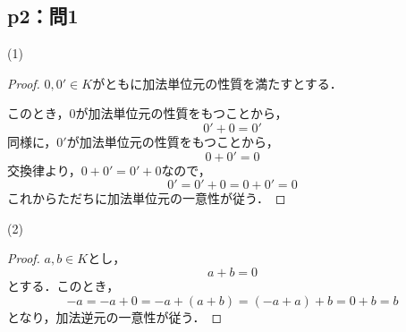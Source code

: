 \documentclass[uplatex,dvipdfmx,a4paper,10pt,fleqn]{jsarticle}
\begin{document}
\subsection*{p2：問1}

\begin{itembox}[c]{(1)}
    \begin{proof}
$0,0' \in K$がともに加法単位元の性質を満たすとする．

このとき，$0$が加法単位元の性質をもつことから，
\[
    0'+0=0'
\]
同様に，$0'$が加法単位元の性質をもつことから，
\[
    0+0' = 0
\]
交換律より，$0+0'=0'+0$なので，
\[
    0'=0'+0 =0+0' =0
\]
これからただちに加法単位元の一意性が従う．
    \end{proof}
    \end{itembox}
    \begin{itembox}[c]{(2)}
        \begin{proof}
$a ,b \in K$とし，
\[
    a+b =0
\]
とする．このとき，
\[
    -a = -a+0 = -a +(a+b)=(-a+a)+b =0+b = b
\]
となり，加法逆元の一意性が従う．
        \end{proof}
    \end{itembox}
\end{document}
